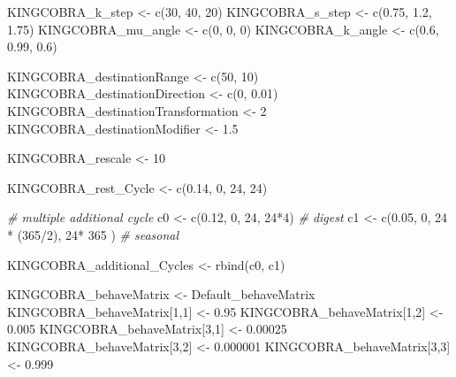 \documentclass[10pt,a4paper]{article}
\newenvironment{Shaded}{}{}
\newcommand{\CommentTok}[1]{\textit{#1}}
\newcommand{\DecValTok}[1]{#1}
\newcommand{\FloatTok}[1]{#1}
\newcommand{\FunctionTok}[1]{#1}
\newcommand{\NormalTok}[1]{#1}
\newcommand{\OtherTok}[1]{#1}
\newcommand{\SpecialCharTok}[1]{#1}
\begin{document}
\begin{Shaded}
\begin{Highlighting}[]
\NormalTok{KINGCOBRA\_k\_step }\OtherTok{\textless{}{-}} \FunctionTok{c}\NormalTok{(}\DecValTok{30}\NormalTok{, }\DecValTok{40}\NormalTok{, }\DecValTok{20}\NormalTok{)}
\NormalTok{KINGCOBRA\_s\_step }\OtherTok{\textless{}{-}} \FunctionTok{c}\NormalTok{(}\FloatTok{0.75}\NormalTok{, }\FloatTok{1.2}\NormalTok{, }\FloatTok{1.75}\NormalTok{)}
\NormalTok{KINGCOBRA\_mu\_angle }\OtherTok{\textless{}{-}} \FunctionTok{c}\NormalTok{(}\DecValTok{0}\NormalTok{, }\DecValTok{0}\NormalTok{, }\DecValTok{0}\NormalTok{)}
\NormalTok{KINGCOBRA\_k\_angle }\OtherTok{\textless{}{-}} \FunctionTok{c}\NormalTok{(}\FloatTok{0.6}\NormalTok{, }\FloatTok{0.99}\NormalTok{, }\FloatTok{0.6}\NormalTok{)}

\NormalTok{KINGCOBRA\_destinationRange }\OtherTok{\textless{}{-}} \FunctionTok{c}\NormalTok{(}\DecValTok{50}\NormalTok{, }\DecValTok{10}\NormalTok{)}
\NormalTok{KINGCOBRA\_destinationDirection }\OtherTok{\textless{}{-}} \FunctionTok{c}\NormalTok{(}\DecValTok{0}\NormalTok{, }\FloatTok{0.01}\NormalTok{)}
\NormalTok{KINGCOBRA\_destinationTransformation }\OtherTok{\textless{}{-}} \DecValTok{2}
\NormalTok{KINGCOBRA\_destinationModifier }\OtherTok{\textless{}{-}} \FloatTok{1.5}

\NormalTok{KINGCOBRA\_rescale }\OtherTok{\textless{}{-}} \DecValTok{10}


\NormalTok{KINGCOBRA\_rest\_Cycle }\OtherTok{\textless{}{-}} \FunctionTok{c}\NormalTok{(}\FloatTok{0.14}\NormalTok{, }\DecValTok{0}\NormalTok{, }\DecValTok{24}\NormalTok{, }\DecValTok{24}\NormalTok{)}

\CommentTok{\# multiple additional cycle}
\NormalTok{c0 }\OtherTok{\textless{}{-}} \FunctionTok{c}\NormalTok{(}\FloatTok{0.12}\NormalTok{, }\DecValTok{0}\NormalTok{, }\DecValTok{24}\NormalTok{, }\DecValTok{24}\SpecialCharTok{*}\DecValTok{4}\NormalTok{) }\CommentTok{\# digest}
\NormalTok{c1 }\OtherTok{\textless{}{-}} \FunctionTok{c}\NormalTok{(}\FloatTok{0.05}\NormalTok{, }\DecValTok{0}\NormalTok{, }\DecValTok{24} \SpecialCharTok{*}\NormalTok{ (}\DecValTok{365}\SpecialCharTok{/}\DecValTok{2}\NormalTok{), }\DecValTok{24}\SpecialCharTok{*} \DecValTok{365}\NormalTok{ ) }\CommentTok{\# seasonal}

\NormalTok{KINGCOBRA\_additional\_Cycles }\OtherTok{\textless{}{-}} \FunctionTok{rbind}\NormalTok{(c0, c1)}

\NormalTok{KINGCOBRA\_behaveMatrix }\OtherTok{\textless{}{-}}\NormalTok{ Default\_behaveMatrix}
\NormalTok{KINGCOBRA\_behaveMatrix[}\DecValTok{1}\NormalTok{,}\DecValTok{1}\NormalTok{] }\OtherTok{\textless{}{-}} \FloatTok{0.95}
\NormalTok{KINGCOBRA\_behaveMatrix[}\DecValTok{1}\NormalTok{,}\DecValTok{2}\NormalTok{] }\OtherTok{\textless{}{-}} \FloatTok{0.005}
\NormalTok{KINGCOBRA\_behaveMatrix[}\DecValTok{3}\NormalTok{,}\DecValTok{1}\NormalTok{] }\OtherTok{\textless{}{-}} \FloatTok{0.00025}
\NormalTok{KINGCOBRA\_behaveMatrix[}\DecValTok{3}\NormalTok{,}\DecValTok{2}\NormalTok{] }\OtherTok{\textless{}{-}} \FloatTok{0.000001}
\NormalTok{KINGCOBRA\_behaveMatrix[}\DecValTok{3}\NormalTok{,}\DecValTok{3}\NormalTok{] }\OtherTok{\textless{}{-}} \FloatTok{0.999}



\end{Highlighting}
\end{Shaded}
\end{document}
